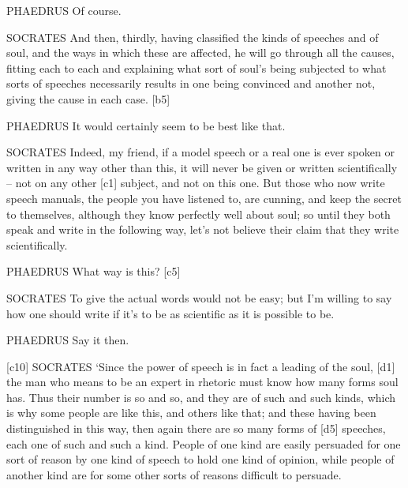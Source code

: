 PHAEDRUS Of course.

SOCRATES And then, thirdly, having classified the
kinds of
speeches and of soul, and the ways in which these are affected, he will
go through all the causes, fitting each to each and explaining what sort
of soul's being subjected to what sorts of speeches necessarily results
in one being convinced and another not, giving the cause in each case.
{[}b5{]}

PHAEDRUS It would certainly seem to be best like that.

SOCRATES Indeed, my friend, if a model
speech or a real one is
ever spoken or written in any way other than this, it will never be
given or written scientifically -- not on any other {[}c1{]} subject,
and not on this one. But
those who now write speech manuals, the people you have listened to, are
cunning, and keep the secret to themselves, although they know perfectly
well about soul; so until they both speak and write in the following
way, let's not believe their claim that they write scientifically.

PHAEDRUS What way is this? {[}c5{]}

SOCRATES To give the actual words would not be easy; but I'm willing to
say how one should write
if it's to be as scientific as it is possible to be.

PHAEDRUS Say it then.

{[}c10{]} SOCRATES ‘Since the power of speech is in fact a leading of
the soul, {[}d1{]} the man who means to be an expert in rhetoric must
know how many forms soul has. Thus their number is so and so, and they
are of such and such kinds, which is why some people are like this, and
others like that; and these having been distinguished in this way, then
again there are so many forms of {[}d5{]} speeches, each one of such and
such a kind. People of one kind are easily persuaded for one sort of
reason by one kind of speech to hold one kind of opinion, while people
of another kind are for some other sorts of reasons difficult to
persuade.

